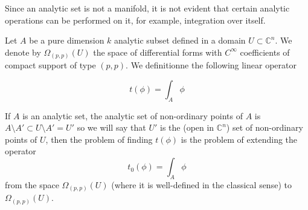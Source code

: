 \documentclass[12pt,twoside,a4paper]{report}
\begin{document}
Since an analytic set is not a manifold, it is not evident that certain analytic operations can be performed on it, for example, integration over itself.

Let $A$ be a pure dimension $k$ analytic subset defined in a domain $U\subset\mathbb{C}^n$. We denote by $\Omega_{(p,p)}(U)$ the space of differential forms with $C^{\infty}$ coefficients of compact support of type $(p,p)$. We definitionne the following linear operator

\[
    t(\phi)=\int_{A}\phi
\]

If $A$ is an analytic set, the analytic set of non-ordinary points of $A$ is $A\setminus A'\subset U\setminus A'=U'$ so we will say that $U'$ is the (open in $\mathbb{C}^n$) set of non-ordinary points of $U$, then the problem of finding $t(\phi)$ is the problem of extending the operator
\[
    t_0(\phi)=\int_{A}\phi
\]
from the space $\Omega_{(p,p)}(U)$ (where it is well-defined in the classical sense) to $\Omega_{(p,p)}(U)$.
\end{document}
